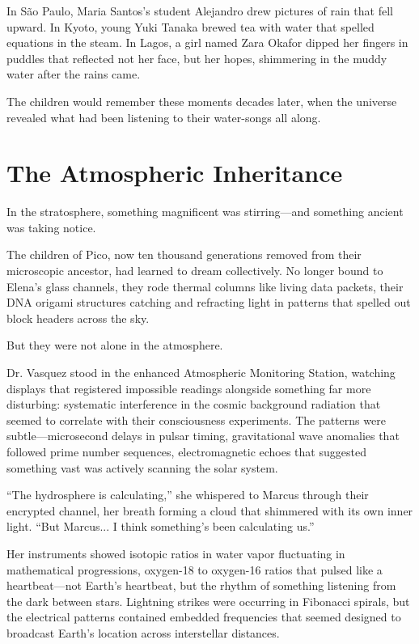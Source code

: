 \documentclass[12pt,a4paper]{book}
\begin{document}
In São Paulo, Maria Santos's student Alejandro drew pictures of rain that fell upward. In Kyoto, young Yuki Tanaka brewed tea with water that spelled equations in the steam. In Lagos, a girl named Zara Okafor dipped her fingers in puddles that reflected not her face, but her hopes, shimmering in the muddy water after the rains came.

The children would remember these moments decades later, when the universe revealed what had been listening to their water-songs all along.

\section{The Atmospheric Inheritance}

In the stratosphere, something magnificent was stirring—and something ancient was taking notice.

The children of Pico, now ten thousand generations removed from their microscopic ancestor, had learned to dream collectively. No longer bound to Elena's glass channels, they rode thermal columns like living data packets, their DNA origami structures catching and refracting light in patterns that spelled out block headers across the sky.

But they were not alone in the atmosphere.

Dr. Vasquez stood in the enhanced Atmospheric Monitoring Station, watching displays that registered impossible readings alongside something far more disturbing: systematic interference in the cosmic background radiation that seemed to correlate with their consciousness experiments. The patterns were subtle—microsecond delays in pulsar timing, gravitational wave anomalies that followed prime number sequences, electromagnetic echoes that suggested something vast was actively scanning the solar system.

``The hydrosphere is calculating,'' she whispered to Marcus through their encrypted channel, her breath forming a cloud that shimmered with its own inner light. ``But Marcus... I think something's been calculating us.''

Her instruments showed isotopic ratios in water vapor fluctuating in mathematical progressions, oxygen-18 to oxygen-16 ratios that pulsed like a heartbeat—not Earth's heartbeat, but the rhythm of something listening from the dark between stars. Lightning strikes were occurring in Fibonacci spirals, but the electrical patterns contained embedded frequencies that seemed designed to broadcast Earth's location across interstellar distances.
\end{document}
